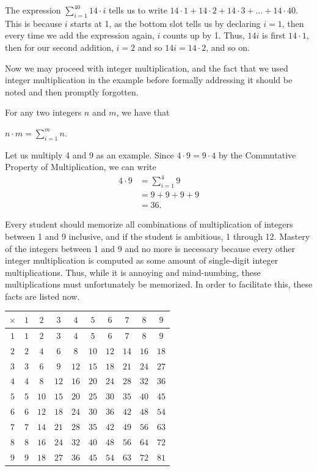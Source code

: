 \documentclass[openany]{book}
\begin{document}
\begin{example}
		The expression $\sum_{i=1}^{40}14\cdot i$ tells us to write $14\cdot1+14\cdot2+14\cdot3+\ldots+14\cdot40$. This is because $i$ starts at 1, as the bottom slot tells us by declaring $i=1$, then every time we add the expression again, $i$ counts up by 1. Thus, $14i$ is first $14\cdot1$, then for our second addition, $i=2$ and so $14i=14\cdot2$, and so on.
\end{example}
Now we may proceed with integer multiplication, and the fact that we used integer multiplication in the example before formally addressing it should be noted and then promptly forgotten.\par
For any two integers $n$ and $m$, we have that
\begin{center}
	$n\cdot m = \sum_{i=1}^{m}n$.
\end{center}
\begin{example}
	Let us multiply 4 and 9 as an example. Since $4\cdot9=9\cdot4$ by the Commutative Property of Multiplication, we can write
	\begin{align}
		4\cdot9&=\sum_{i=1}^{4}9\\
			&= 9+9+9+9\\
			&= 36.
	\end{align}
\end{example}\par
Every student should memorize all combinations of multiplication of integers between 1 and 9 inclusive, and if the student is ambitious, 1 through 12. Mastery of the integers between 1 and 9 and no more is necessary because every other integer multiplication is computed as some amount of single-digit integer multiplications. Thus, while it is annoying and mind-numbing, these multiplications must unfortunately be memorized. In order to facilitate this, these facts are listed now.\par
\begin{center}
	\begin{tabular}{|c||c|c|c|c|c|c|c|c|c|}
		\hline
		$\times$&$1$&$2$&$3$&$4$&$5$&$6$&$7$&$8$&$9$\\\hline\hline
		$1$&$1$&$2$&$3$&$4$&$5$&$6$&$7$&$8$&$9$\\\hline
		$2$&$2$&$4$&$6$&$8$&$10$&$12$&$14$&$16$&$18$\\\hline
		$3$&$3$&$6$&$9$&$12$&$15$&$18$&$21$&$24$&$27$\\\hline
		$4$&$4$&$8$&$12$&$16$&$20$&$24$&$28$&$32$&$36$\\\hline
		$5$&$5$&$10$&$15$&$20$&$25$&$30$&$35$&$40$&$45$\\\hline
		$6$&$6$&$12$&$18$&$24$&$30$&$36$&$42$&$48$&$54$\\\hline
		$7$&$7$&$14$&$21$&$28$&$35$&$42$&$49$&$56$&$63$\\\hline
		$8$&$8$&$16$&$24$&$32$&$40$&$48$&$56$&$64$&$72$\\\hline
		$9$&$9$&$18$&$27$&$36$&$45$&$54$&$63$&$72$&$81$\\\hline
	\end{tabular}
\end{center}
\end{document}
